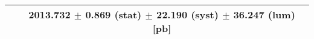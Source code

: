 \begin{tabular}{lc}
\hline
                               & 2013.732 $\pm$ 0.869 (stat) $\pm$ 22.190 (syst) $\pm$ 36.247 (lum) [pb]  \\
\hline
\end{tabular}
